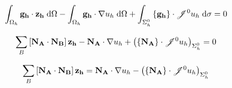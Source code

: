 \documentclass[11pt,a4paper]{article}
\begin{document}
\begin{dmath}
  \int_{\Omega_h} {\bf g_h} \cdot {\bf z_h} \; \text{d}\Omega - \int_{\Omega_h} {\bf g_h} \cdot \nabla u_h \; \text{d}\Omega + \int_{\Sigma^0_h} \left\{ {\bf g_h} \right\} \cdot \mathscr{J}^0 u_h \; \text{d}\sigma = 0
\end{dmath}

\begin{dmath}
  \sum_B \left[ {\bf N_A} \cdot {\bf N_B} \right] {\bf z_h} - {\bf N_A} \cdot \nabla u_h + \left( \left\{ {\bf N_A} \right\} \cdot \mathscr{J}^0 u_h \right)_{\Sigma^0_h} = 0
\end{dmath}

\begin{dmath}
  \sum_B \left[ {\bf N_A} \cdot {\bf N_B} \right] {\bf z_h} = {\bf N_A} \cdot \nabla u_h - \left( \left\{ {\bf N_A} \right\} \cdot \mathscr{J}^0 u_h \right)_{\Sigma^0_h}
\end{dmath}

\end{document}

